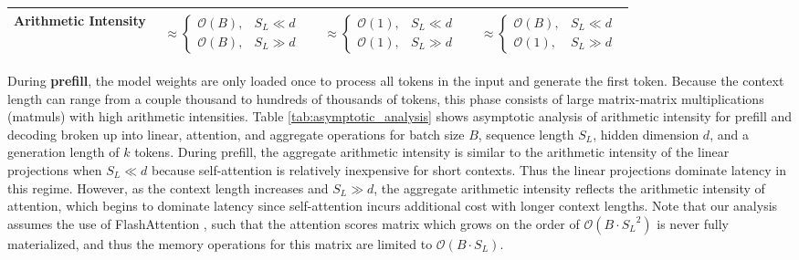 \begin{table*}[h]
\begin{tabularx}{\textwidth}{l|Y|Y|Y}
  \midrule
  Arithmetic Intensity 
      & 
        $\begin{array}{ll}
            \approx \begin{cases}
                \mathcal{O}(B), & S_L \ll d \\
                \mathcal{O}(B), & S_L \gg d
            \end{cases}
        \end{array}$
      & 
        $\begin{array}{ll}
            \approx  \begin{cases}
                \mathcal{O}(1), & S_L \ll d \\
                \mathcal{O}(1), & S_L \gg d
            \end{cases}
        \end{array}$
      & 
        $\begin{array}{ll}
            \approx \begin{cases}
                \mathcal{O}(B), & S_L \ll d \\
                \mathcal{O}(1), & S_L \gg d
            \end{cases}
        \end{array}$ \\
  \bottomrule
\end{tabularx}
\end{table*}

During \textbf{prefill}, the model weights are only loaded once to process all tokens in the input and generate the first token. Because the context length can range from a couple thousand to hundreds of thousands of tokens, this phase consists of large matrix-matrix multiplications (matmuls) with high arithmetic intensities. Table \ref{tab:asymptotic_analysis} shows asymptotic analysis of arithmetic intensity for prefill and decoding broken up into linear, attention, and aggregate operations for batch size $B$, sequence length $S_L$, hidden dimension $d$, and a generation length of $k$ tokens. During prefill, the aggregate arithmetic intensity is similar to the arithmetic intensity of the linear projections when $S_L \ll d$ because self-attention is relatively inexpensive for short contexts. Thus the linear projections dominate latency in this regime. However, as the context length increases and $S_L \gg d$, the aggregate arithmetic intensity reflects the arithmetic intensity of attention, which begins to dominate latency since self-attention incurs additional cost with longer context lengths. Note that our analysis assumes the use of FlashAttention \cite{flashattention}, such that the attention scores matrix which grows on the order of $\mathcal{O}(B \cdot {S_L}^2)$ is never fully materialized, and thus the memory operations for this matrix are limited to $\mathcal{O}(B \cdot S_L)$.

